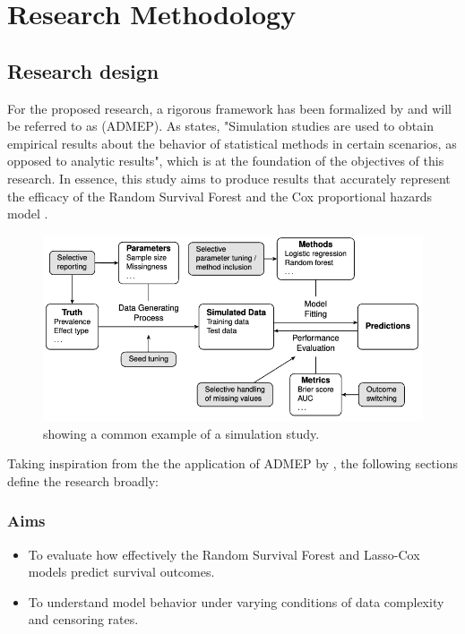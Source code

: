 \chapter{Research Methodology}
\label{Chapter2} %

\section{Research design} \label{design}
For the proposed research, a rigorous framework has been formalized by \parencite{morris_using_2019} and will be referred to as (ADMEP). As \parencite{morris_using_2019} states, "Simulation studies are used to obtain empirical results about the behavior of statistical methods in certain scenarios, as opposed to analytic results", which is at the foundation of the objectives of this research. In essence, this study aims to produce results that accurately represent the efficacy of the Random Survival Forest \parencite{ishwaran_random_2008} and the Cox proportional hazards model \parencite{cox_regression_1972}. 

\begin{figure}[h]
 \centering
 \includegraphics[scale=0.48]{Figures/METHOD_GRAPH.png}
 \caption{\parencite{pawel_pitfalls_2024} showing a common example of a simulation study.}
\end{figure}

\noindent Taking inspiration from the the application of ADMEP by \parencite{pawel_pitfalls_2024}, the following sections define the research broadly:

\subsection{Aims}
\begin{itemize} 
\item To evaluate how effectively the Random Survival Forest and Lasso-Cox models predict survival outcomes.
\item To understand model behavior under varying conditions of data complexity and censoring rates.
\end{itemize}

